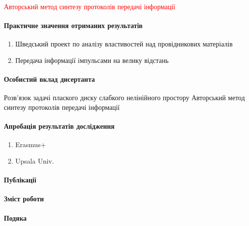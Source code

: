 \textcolor{red}{Авторський метод синтезу протоколів передачі інформації}

\paragraph{Практичне значення отриманих результатів}

\begin{enumerate} 
	\item Шведський проект по аналізу властивостей над провідникових матеріалів
	\item Передача інформації імпульсами на велику відстань
\end{enumerate} 

\paragraph{Особистий вклад дисертанта}

Розв'язок задачі плаского диску слабкого нелінійного простору
Авторський метод синтезу протоколів передачі інформації

\paragraph{Апробація результатів дослідження}

\begin{enumerate} 
	\item Erasmus+
	\item Upsala Univ.
\end{enumerate} 

\paragraph{Публікації}

\paragraph{Зміст роботи}

\paragraph{Подяка}
